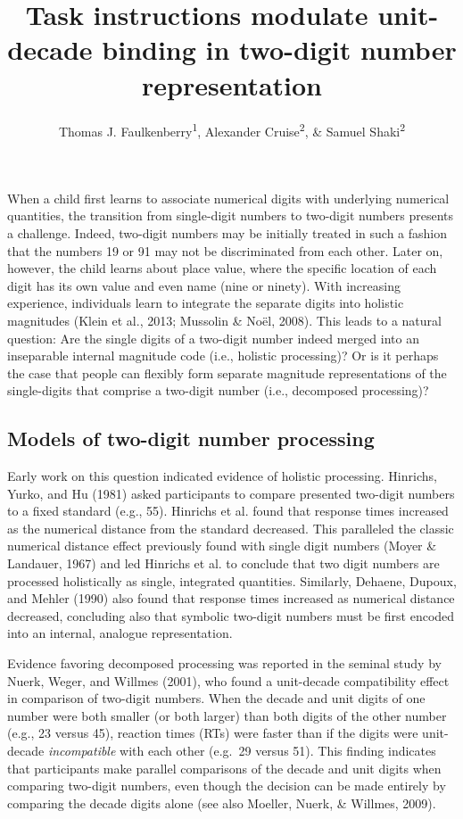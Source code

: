 \documentclass[english,man]{apa6}
\title{Task instructions modulate unit-decade binding in two-digit number
representation}
\author{Thomas J. Faulkenberry\textsuperscript{1}, Alexander Cruise\textsuperscript{2}, \& Samuel Shaki\textsuperscript{2}}
\affiliation{
    \vspace{0.5cm}
          \textsuperscript{1} Tarleton State University\\
          \textsuperscript{2} Ariel University  }
\theoremstyle{definition}
\theoremstyle{definition}
\theoremstyle{definition}
\theoremstyle{remark}
\begin{document}
\maketitle

\setcounter{secnumdepth}{0}



When a child first learns to associate numerical digits with underlying
numerical quantities, the transition from single-digit numbers to
two-digit numbers presents a challenge. Indeed, two-digit numbers may be
initially treated in such a fashion that the numbers 19 or 91 may not be
discriminated from each other. Later on, however, the child learns about
place value, where the specific location of each digit has its own value
and even name (nine or ninety). With increasing experience, individuals
learn to integrate the separate digits into holistic magnitudes (Klein
et al., 2013; Mussolin \& Noël, 2008). This leads to a natural question:
Are the single digits of a two-digit number indeed merged into an
inseparable internal magnitude code (i.e., holistic processing)? Or is
it perhaps the case that people can flexibly form separate magnitude
representations of the single-digits that comprise a two-digit number
(i.e., decomposed processing)?

\subsection{Models of two-digit number
processing}\label{models-of-two-digit-number-processing}

Early work on this question indicated evidence of holistic processing.
Hinrichs, Yurko, and Hu (1981) asked participants to compare presented
two-digit numbers to a fixed standard (e.g., 55). Hinrichs et al. found
that response times increased as the numerical distance from the
standard decreased. This paralleled the classic numerical distance
effect previously found with single digit numbers (Moyer \& Landauer,
1967) and led Hinrichs et al. to conclude that two digit numbers are
processed holistically as single, integrated quantities. Similarly,
Dehaene, Dupoux, and Mehler (1990) also found that response times
increased as numerical distance decreased, concluding also that symbolic
two-digit numbers must be first encoded into an internal, analogue
representation.

Evidence favoring decomposed processing was reported in the seminal
study by Nuerk, Weger, and Willmes (2001), who found a unit-decade
compatibility effect in comparison of two-digit numbers. When the decade
and unit digits of one number were both smaller (or both larger) than
both digits of the other number (e.g., 23 versus 45), reaction times
(RTs) were faster than if the digits were unit-decade
\emph{incompatible} with each other (e.g.~29 versus 51). This finding
indicates that participants make parallel comparisons of the decade and
unit digits when comparing two-digit numbers, even though the decision
can be made entirely by comparing the decade digits alone (see also
Moeller, Nuerk, \& Willmes, 2009).
\end{document}
